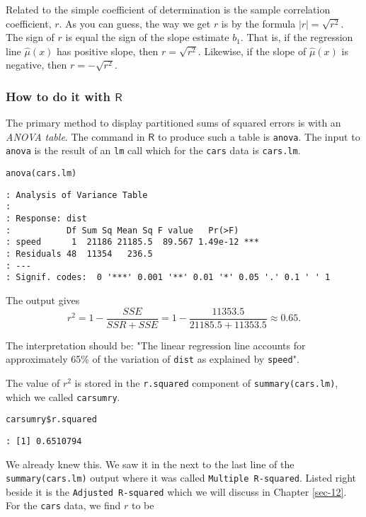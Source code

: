 Related to the simple coefficient of determination is the sample
correlation coefficient, \(r\). As you can guess, the way we get \(r\)
is by the formula \(|r|=\sqrt{r^{2}}\). The sign of \(r\) is equal the
sign of the slope estimate \(b_{1}\). That is, if the regression line
\(\hat{\mu}(x)\) has positive slope, then
\(r=\sqrt{r^{2}}\). Likewise, if the slope of \(\hat{\mu}(x)\) is
negative, then \(r=-\sqrt{r^{2}}\).

\subsubsection{How to do it with \(\mathsf{R}\)}
\label{sec-11-3-2-1}

The primary method to display partitioned sums of squared errors is
with an \emph{ANOVA table}. The command in \(\mathsf{R}\) to produce such a
table is \texttt{anova}. The input to \texttt{anova} is the result of an \texttt{lm} call
which for the \texttt{cars} data is \texttt{cars.lm}.

\begin{verbatim}
anova(cars.lm)
\end{verbatim}

\begin{verbatim}
: Analysis of Variance Table
: 
: Response: dist
:           Df Sum Sq Mean Sq F value   Pr(>F)    
: speed      1  21186 21185.5  89.567 1.49e-12 ***
: Residuals 48  11354   236.5                     
: ---
: Signif. codes:  0 '***' 0.001 '**' 0.01 '*' 0.05 '.' 0.1 ' ' 1
\end{verbatim}

The output gives
\[
r^{2}=1-\frac{SSE}{SSR+SSE}=1-\frac{11353.5}{21185.5+11353.5}\approx0.65.
\]

The interpretation should be: "The linear regression line accounts for
approximately 65\% of the variation of \texttt{dist} as explained by \texttt{speed}".

The value of \(r^{2}\) is stored in the \texttt{r.squared} component of
\texttt{summary(cars.lm)}, which we called \texttt{carsumry}.

\begin{verbatim}
carsumry$r.squared
\end{verbatim}

\begin{verbatim}
: [1] 0.6510794
\end{verbatim}

We already knew this. We saw it in the next to the last line of the
\texttt{summary(cars.lm)} output where it was called \texttt{Multiple
R-squared}. Listed right beside it is the \texttt{Adjusted R-squared} which
we will discuss in Chapter \ref{sec-12}.  For the \texttt{cars}
data, we find \(r\) to be

